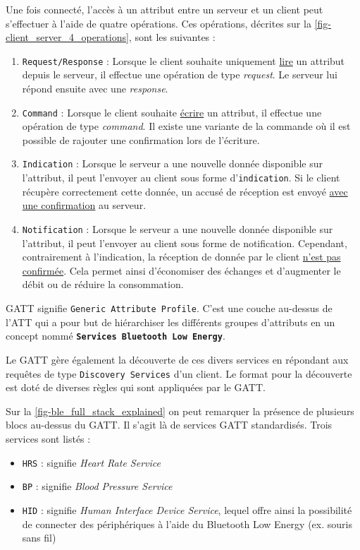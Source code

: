 Une fois connecté, l'accès à un attribut entre un serveur et un client peut s'effectuer à l'aide de quatre opérations. Ces opérations, décrites sur la \cref{fig-client_server_4_operations}, sont les suivantes :
\begin{enumerate}
    \item \texttt{Request/Response} : Lorsque le client souhaite uniquement \underline{lire} un attribut depuis le serveur, il effectue une opération de type \textit{request}. Le serveur lui répond ensuite avec une \textit{response}. 
    \item \texttt{Command} : Lorsque le client souhaite \underline{écrire} un attribut, il effectue une opération de type \textit{command}. Il existe une variante de la commande où il est possible de rajouter une confirmation lors de l'écriture.
    \item \texttt{Indication} : Lorsque le serveur a une nouvelle donnée disponible sur l'attribut, il peut l'envoyer au client sous forme d'\texttt{indication}. Si le client récupère correctement cette donnée, un accusé de réception est envoyé \underline{avec une confirmation} au serveur.
    \item \texttt{Notification} : Lorsque le serveur a une nouvelle donnée disponible sur l'attribut, il peut l'envoyer au client sous forme de notification. Cependant, contrairement à l'indication, la réception de donnée par le client \underline{n'est pas confirmée}. Cela permet ainsi d'économiser des échanges et d'augmenter le débit ou de réduire la consommation. 
\end{enumerate}


GATT signifie \texttt{Generic Attribute Profile}. C'est une couche au-dessus de l’ATT qui a pour but de hiérarchiser les différents groupes d'attributs en un concept nommé \texttt{\textbf{Services Bluetooth Low Energy}}. 

Le GATT gère également la découverte de ces divers services en répondant aux requêtes de type \texttt{Discovery Services} d'un client. Le format pour la découverte est doté de diverses règles qui sont appliquées par le GATT.


\label{sec-protocols_BLE_services}

Sur la \cref{fig-ble_full_stack_explained} on peut remarquer la présence de plusieurs blocs au-dessus du GATT. Il s'agit là de services GATT standardisés. Trois services sont listés : 
 \begin{itemize}
     \item \texttt{HRS} : signifie \textit{Heart Rate Service}
     \item \texttt{BP} : signifie \textit{Blood Pressure Service}
     \item \texttt{HID} : signifie \textit{Human Interface Device Service}, lequel offre ainsi la possibilité de connecter des périphériques à l'aide du Bluetooth Low Energy (ex. souris sans fil)
 \end{itemize}


